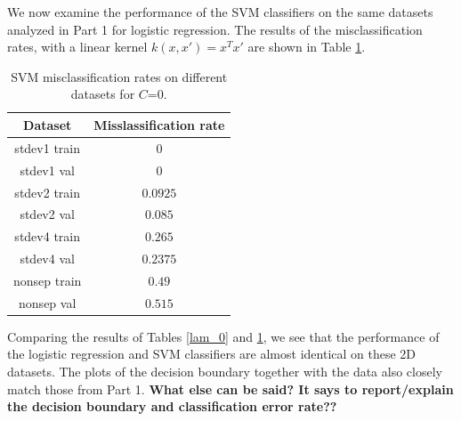 \documentclass[10pt]{article}
\begin{document}
We now examine the performance of the SVM classifiers on the same datasets analyzed in Part 1 for logistic regression.  The results of the misclassification rates, with a linear kernel $k(x,x') = x^Tx'$ are shown in Table \ref{C_0}.  

\begin{table}[H]
\begin{tabular}{|c|c|}
\hline
\textbf{Dataset} & \textbf{Misslassification rate} \\ \hline
stdev1 train & $0$\\ \hline
stdev1 val & $0$\\ \hline
stdev2 train & $0.0925$\\ \hline
stdev2 val & $0.085$\\ \hline
stdev4 train & $0.265$\\ \hline
stdev4 val & $0.2375$\\ \hline
nonsep train & $0.49$\\ \hline
nonsep val & $0.515$\\ \hline
\end{tabular}
\label{C_0}
\caption{SVM misclassification rates on different datasets for $C$=0.}
\end{table}

Comparing the results of Tables \ref{lam_0} and \ref{C_0}, we see that the performance of the logistic regression and SVM classifiers are almost identical on these 2D datasets.  The plots of the decision boundary together with the data also closely match those from Part 1.  \textbf{What else can be said?  It says to report/explain the decision boundary and classification error rate??}
\end{document}
